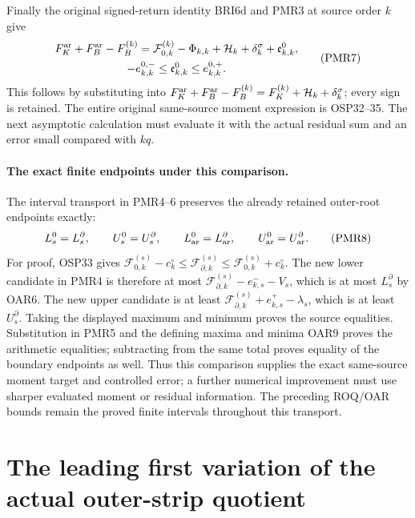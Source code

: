\documentclass[11pt,a4paper]{article}
\begin{document}
Finally the original signed-return identity BRI6d and PMR3 at
source order $k$ give
\[
 \begin{gathered}
 F_K^{\rm ar}+F_B^{\rm ar}-F_B^{(k)}
   =\mathcal F_{0,k}^{(k)}-\Phi_{k,k}
      +\mathcal H_k+\delta_k^\sigma+\mathfrak e^0_{k,k},\\
 -e_{k,k}^{0,-}\le\mathfrak e^0_{k,k}\le e_{k,k}^{0,+}.
 \end{gathered}\tag{PMR7}
\]
This follows by substituting into
$F_K^{\rm ar}+F_B^{\rm ar}-F_B^{(k)}=F_K^{(k)}+
\mathcal H_k+\delta_k^\sigma$; every sign is retained.
The entire original same-source moment expression is OSP32--35.
The next asymptotic calculation must evaluate it with the actual
residual sum and an error small compared with $kq$.

\paragraph{The exact finite endpoints under this comparison.}
The interval transport in PMR4--6 preserves the already retained
outer-root endpoints exactly:
\[
 L_s^0=L_s^\partial,\qquad U_s^0=U_s^\partial,\qquad
 L_{\rm ar}^0=L_{\rm ar}^\partial,\qquad
 U_{\rm ar}^0=U_{\rm ar}^\partial.
 \tag{PMR8}
\]
For proof, OSP33 gives
$\mathcal F_{0,k}^{(s)}-c_k^\circ\le\mathcal F_{\partial,k}^{(s)}
\le\mathcal F_{0,k}^{(s)}+c_k^\circ$.
The new lower candidate in PMR4 is therefore at most
$\mathcal F_{\partial,k}^{(s)}-e_{k,s}^--V_s$, which is at
most $L_s^\partial$ by OAR6. The new upper candidate is at
least $\mathcal F_{\partial,k}^{(s)}+e_{k,s}^+-\lambda_s$,
which is at least $U_s^\partial$. Taking the displayed maximum
and minimum proves the source equalities. Substitution in PMR5
and the defining maxima and minima OAR9 proves the arithmetic
equalities; subtracting from the same total proves equality of
the boundary endpoints as well. Thus this comparison supplies
the exact same-source moment target and controlled error; a
further numerical improvement must use sharper evaluated moment
or residual information. The preceding ROQ/OAR bounds remain
the proved finite intervals throughout this transport.



\clearpage
\section{The leading first variation of the actual outer-strip quotient}
\label{sec:OFV}
\end{document}
